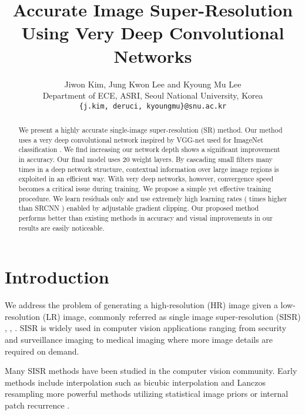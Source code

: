 \documentclass[10pt,twocolumn,letterpaper]{article}
\begin{document}
\title{Accurate Image Super-Resolution Using Very Deep Convolutional Networks}

\author{Jiwon Kim, Jung Kwon Lee and Kyoung Mu Lee\\
	Department of ECE, ASRI, Seoul National University, Korea\\
	{\tt\small \{j.kim, deruci, kyoungmu\}@snu.ac.kr}
}

\maketitle



\begin{abstract}
We present a highly accurate single-image super-resolution (SR) method. Our method uses a very deep convolutional network inspired by VGG-net used for ImageNet classification \cite{simonyan2015very}. We find increasing our network depth shows a significant improvement in accuracy. Our final model uses 20 weight layers. By cascading small filters many times in a deep network structure, contextual information over large image regions is exploited in an efficient way. With very deep networks, however, convergence speed becomes a critical issue during training. We propose a simple yet effective training procedure. We learn residuals only and use extremely high learning rates ( times higher than SRCNN \cite{dong2015image}) enabled by adjustable gradient clipping. Our proposed method performs better than existing methods in accuracy and visual improvements in our results are easily noticeable.
\end{abstract}

\section{Introduction}
We address the problem of generating a high-resolution (HR) image given a low-resolution (LR) image, commonly referred as single image super-resolution (SISR) \cite{Irani1991}, \cite{freeman2000learning}, \cite{glasner2009super}. SISR is widely used in computer vision applications ranging from security and surveillance imaging to medical imaging where more image details are required on demand.

Many SISR methods have been studied in the computer vision community. Early methods include interpolation such as bicubic interpolation and Lanczos resampling \cite{duchon1979lanczos} more powerful methods utilizing statistical image priors \cite{sun2008image,Kim2010} or internal patch recurrence \cite{glasner2009super}.
\end{document}
